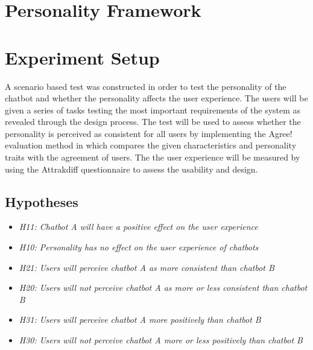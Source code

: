 \vspace{5mm} %

\section{Personality Framework}

\vspace{5mm} %

\section{Experiment Setup}

A scenario based test was constructed in order to test the personality of the chatbot and whether the personality affects the user experience. The users will be given a series of tasks testing the most important requirements of the system as revealed through the design process. The test will be used to assess whether the personality is perceived as consistent for all users by implementing the Agree! evaluation method in which compares the given characteristics and personality traits with the agreement of users. The the user experience will be measured by using the Attrakdiff questionnaire to assess the usability and design. 

\vspace{5mm} %

    \subsection{Hypotheses}
 
    \begin{itemize}
         \item \textit {H11: Chatbot A will have a positive effect on the user experience}
        \item \textit {H10: Personality has no effect on the user experience of chatbots}
            \vspace{5mm} %

        \item \textit {H21: Users will perceive chatbot A as more consistent than chatbot B}
        \item  \textit {H20: Users will not perceive chatbot A as more or less consistent than chatbot B} 
            \vspace{5mm} %

        \item \textit {H31: Users will perceive chatbot A more positively than chatbot B}
        \item \textit {H30: Users will not perceive chatbot A more or less positively than chatbot B}
    \end{itemize}
    
